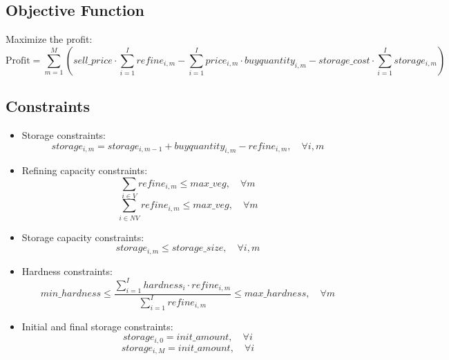 \documentclass{article}
\begin{document}
\subsection*{Objective Function}
Maximize the profit:
\[
\text{Profit} = \sum_{m=1}^{M} \left( sell\_price \cdot \sum_{i=1}^{I} refine_{i,m} - \sum_{i=1}^{I} price_{i,m} \cdot buyquantity_{i,m} - storage\_cost \cdot \sum_{i=1}^{I} storage_{i,m} \right)
\]

\subsection*{Constraints}
\begin{itemize}
    \item Storage constraints:
    \[
    storage_{i,m} = storage_{i,m-1} + buyquantity_{i,m} - refine_{i,m}, \quad \forall i, m
    \]
    
    \item Refining capacity constraints:
    \[
    \sum_{i \in V} refine_{i,m} \leq max\_veg, \quad \forall m
    \]
    \[
    \sum_{i \in NV} refine_{i,m} \leq max\_veg, \quad \forall m
    \]
    
    \item Storage capacity constraints:
    \[
    storage_{i,m} \leq storage\_size, \quad \forall i, m
    \]
    
    \item Hardness constraints:
    \[
    min\_hardness \leq \frac{\sum_{i=1}^{I} hardness_i \cdot refine_{i,m}}{\sum_{i=1}^{I} refine_{i,m}} \leq max\_hardness, \quad \forall m
    \]
    
    \item Initial and final storage constraints:
    \[
    storage_{i,0} = init\_amount, \quad \forall i
    \]
    \[
    storage_{i,M} = init\_amount, \quad \forall i
    \]
\end{itemize}
\end{document}
